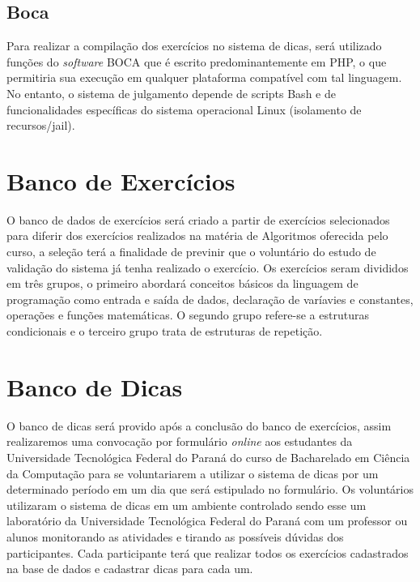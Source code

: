 \subsection{Boca}

Para realizar a compilação dos exercícios no sistema de dicas, será utilizado funções do \textit{software} BOCA que é escrito predominantemente em PHP, o que permitiria sua execução em qualquer plataforma compatível com tal linguagem. No entanto, o sistema de julgamento depende de scripts Bash e de funcionalidades específicas do sistema operacional Linux (isolamento de recursos/jail). 

\section{Banco de Exercícios}

O banco de dados de exercícios será criado a partir de exercícios selecionados para diferir dos exercícios realizados na matéria de Algoritmos oferecida pelo curso, a seleção terá a finalidade de previnir que o voluntário do estudo de validação do sistema já tenha realizado o exercício. Os exercícios seram divididos em três grupos, o primeiro abordará conceitos básicos da linguagem de programação como entrada e saída de dados, declaração de varíavies e constantes, operações e funções matemáticas. O segundo grupo refere-se a estruturas condicionais e o terceiro grupo trata de estruturas de repetição.

\section{Banco de Dicas}

O banco de dicas será provido após a conclusão do banco de exercícios, assim realizaremos uma convocação por formulário \textit{online} aos estudantes da Universidade Tecnológica Federal do Paraná do curso de Bacharelado em Ciência da Computação para se voluntariarem a utilizar o sistema de dicas por um determinado período em um dia que será estipulado no formulário. Os voluntários utilizaram o sistema de dicas em um ambiente controlado sendo esse um laboratório da Universidade Tecnológica Federal do Paraná com um professor ou alunos monitorando as atividades e tirando as possíveis dúvidas dos participantes. Cada participante terá que realizar todos os exercícios cadastrados na base de dados e cadastrar dicas para cada um.